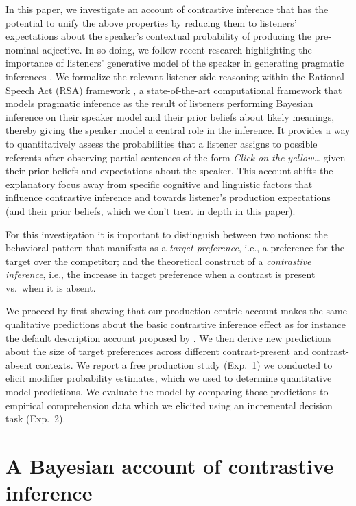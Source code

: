 \documentclass[10pt,letterpaper]{article}
\begin{document}
In this paper, we investigate an account of contrastive inference that has the potential to unify the above properties by reducing them to listeners' expectations about the speaker's contextual probability of producing the pre-nominal adjective. In so doing, we follow recent research highlighting the importance of listeners' generative model of the speaker in generating pragmatic inferences \cite{Hawkins:2018,Kao:2015,Kleinschmidt:2011,Macdonald:1994,Mitchell:1995,Rubio-Fernandez:2018}. We formalize the relevant listener-side reasoning within the Rational Speech Act (RSA) framework \cite{Frank:2012, Goodman:2016, Cohn-Gordon:2018}, a state-of-the-art computational framework that models pragmatic inference as the result of listeners performing Bayesian inference on their speaker model and their prior beliefs about likely meanings, thereby giving the speaker model a central role in the inference. It provides a way to quantitatively assess the probabilities that a listener assigns to possible referents after observing partial sentences of the form \emph{Click on the yellow\dots} given their prior beliefs and expectations about the speaker. This account shifts the explanatory focus away from specific cognitive and linguistic factors that influence contrastive inference and towards listener's production expectations (and their prior beliefs, which we don't treat in depth in this paper).

For this investigation it is important to distinguish between two notions: the behavioral pattern that manifests as a \emph{target preference}, i.e., a preference for the target over the competitor; and the theoretical construct of a \emph{contrastive inference}, i.e., the increase in target preference when a contrast is present vs.~when it is absent.

We proceed by first showing that our production-centric account makes the same qualitative predictions about the basic contrastive inference effect as for instance the default description account proposed by . We then derive new predictions about the size of target preferences across different contrast-present and contrast-absent contexts. We report a free production study (Exp.~1) we conducted to elicit modifier probability estimates, which we used to determine quantitative model predictions. We evaluate the model by comparing those predictions to empirical comprehension data which we elicited using an incremental decision task (Exp.~2).


\section{A Bayesian account of contrastive inference}
\end{document}

